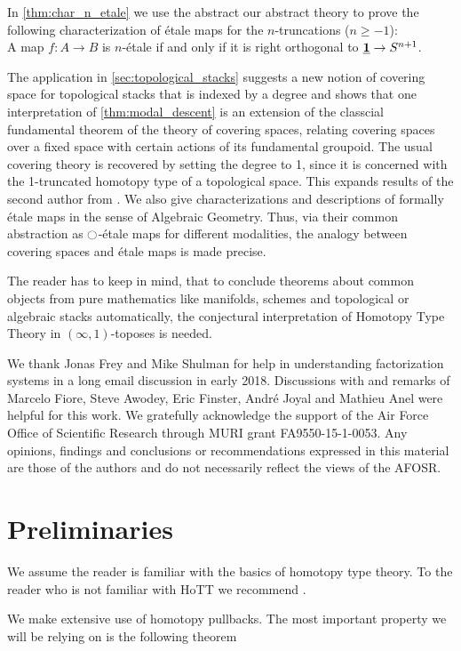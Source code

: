 \documentclass[9pt,twosided]{amsart}
\begin{document}
In \cref{thm:char_n_etale} we use the abstract our abstract theory to prove the following characterization of étale maps for the $n$-truncations ($n\geq -1$): \\
A map $f:A\to B$ is $n$-\'etale if and only if it is right orthogonal to $\underline{\mathbf{1}}\to S^{n+1}$.

The application in \cref{sec:topological_stacks} suggests a new notion of covering space for topological stacks that is indexed by a degree and shows that
one interpretation of \cref{thm:modal_descent} is an extension of the classcial fundamental theorem of the theory of covering spaces,
relating covering spaces over a fixed space with certain actions of its fundamental groupoid.
The usual covering theory is recovered by setting the degree to 1, since it is concerned with the 1-truncated homotopy type of a topological space.
This expands results of the second author from \cite{wellen-oxford-abstract}.
We also give characterizations and descriptions of formally étale maps in the sense of Algebraic Geometry.
Thus, via their common abstraction as ${\ocircle}$-étale maps for different modalities, the analogy between covering spaces and étale maps is made precise.

The reader has to keep in mind, that to conclude theorems about common objects from pure mathematics like manifolds, schemes and topological or algebraic stacks automatically, the conjectural interpretation of Homotopy Type Theory in $(\infty,1)$-toposes is needed. 

  
We thank Jonas Frey and Mike Shulman for help in understanding factorization systems in a long email discussion in early 2018.
Discussions with and remarks of Marcelo Fiore, Steve Awodey, Eric Finster, André Joyal and Mathieu Anel were helpful for this work.
We gratefully acknowledge the support of the Air Force Office of Scientific Research through MURI grant FA9550-15-1-0053. Any opinions, findings and conclusions or recommendations expressed in this material are those of the authors and do not necessarily reflect the views of the AFOSR.


\section{Preliminaries}
We assume the reader is familiar with the basics of homotopy type theory. To the reader who is not familiar with HoTT we recommend \cite{UFP}.

We make extensive use of homotopy pullbacks. The most important property we will be relying on is the following theorem
\end{document}
